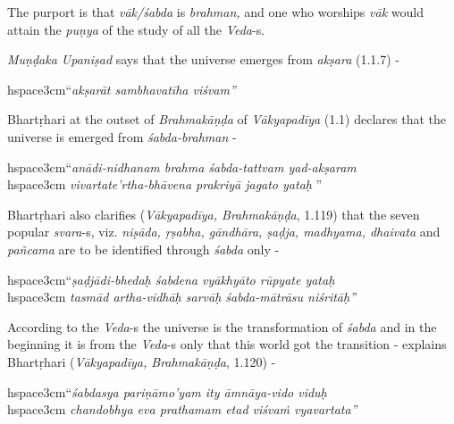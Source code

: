 The purport is that \textit{vāk/śabda} is \textit{brahman,} and one who worships \textit{vāk} would attain the \textit{puṇya} of the study of all the \textit{Veda}-s.

\textit{Muṇḍaka Upaniṣad} says that the universe emerges from \textit{akṣara} (1.1.7) -

\begin{myquote}
hspace{3cm}“\textit{akṣarāt sambhavatīha viśvam”}
\end{myquote}

Bhartṛhari at the outset of \textit{Brahmakāṇḍa} of \textit{Vākyapadīya} (1.1) declares that the universe is emerged from \textit{śabda-brahman} -

\begin{myquote}
hspace{3cm}“\textit{anādi-nidhanam brahma śabda-tattvam yad-akṣaram }\\hspace{3cm} \textit{vivartate’rtha-bhāvena prakriyā jagato yataḥ} ”
\end{myquote}

Bhartṛhari also clarifies (\textit{Vākyapadīya, Brahmakāṇḍa}, 1.119) that the seven popular \textit{svara}-s, viz. \textit{niṣāda, ṛṣabha, gāndhāra, ṣaḍja, madhyama, dhaivata} and \textit{pañcama} are to be identified through \textit{śabda} only -

\begin{myquote}
hspace{3cm}“\textit{ṣaḍjādi-bhedaḥ śabdena vyākhyāto rūpyate yataḥ }\\hspace{3cm} \textit{tasmād artha-vidhāḥ sarvāḥ śabda-mātrāsu niśritāḥ”} 
\end{myquote}

According to the \textit{Veda}-s the universe is the transformation of \textit{śabda} and in the beginning it is from the \textit{Veda}-s only that this world got the transition - explains Bhartṛhari (\textit{Vākyapadīya, Brahmakāṇḍa}, 1.120) -

\begin{myquote}
hspace{3cm}“\textit{śabdasya pariṇāmo’yam ity āmnāya-vido viduḥ }\\hspace{3cm} \textit{chandobhya eva prathamam etad viśvaṁ vyavartata”} 
\end{myquote}

